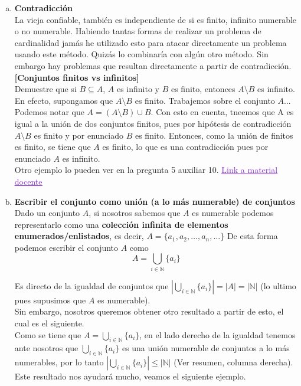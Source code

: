 \documentclass[letterpaper,12pt]{article}
\newcommand{\N}{\mathbb N}
\theoremstyle{plain}
\begin{document}
\begin{enumerate}[a)]
    \newpage
        
    \item \textbf{Contradicción}\\
        La vieja confiable, también es independiente de si es finito, infinito numerable o no numerable. Habiendo tantas formas de realizar un problema de cardinalidad jamás he utilizado esto para atacar directamente un problema usando este método. Quizás lo combinaría con algún otro método. Sin embargo hay problemas que resultan directamente a partir de contradicción.\\
        
        \textbf{[Conjuntos finitos vs infinitos]}\\
        Demuestre que si $B \subseteq A$, $A$ es infinito y $B$ es finito, entonces $A \setminus B$ es infinito.\\
        
        En efecto, supongamos que $A \setminus B$ es finito. Trabajemos sobre el conjunto $A$...\\
        Podemos notar que $A=(A\setminus B)\cup B$. Con esto en cuenta, tneemos que A es igual a la unión de dos conjuntos finitos, pues por hipótesis de contradicción $A \setminus B$ es finito y por enunciado $B$ es finito. Entonces, como la unión de finitos es finito, se tiene que $A$ es finito, lo que es una contradicción pues por enunciado $A$ es infinito.\\
        
        Otro ejemplo lo pueden ver en la pregunta 5 auxiliar 10. \href{https://www.u-cursos.cl/ingenieria/2017/1/MA1101/1/material_docente/}{\textcolor{BlueViolet}{\underline{Link a material docente}}}
        
        \newpage
    \item \textbf{Escribir el conjunto como unión (a lo más numerable) de conjuntos}\\
        Dado un conjunto $A$, si nosotros sabemos que $A$ es numerable podemos representarlo como una \textbf{colección infinita de elementos enumerados/enlistados}, es decir, $A=\{a_1,a_2,\dots, a_n,\dots \}$ De esta forma podemos escribir el conjunto $A$ como
        $$\displaystyle A=\bigcup_{i\in \N} \{a_i\}$$
    
        Es directo de la igualdad de conjuntos que $\displaystyle |\bigcup_{i\in \N} \{a_i\}|= |A| =|\N|$ (lo ultimo pues supusimos que $A$ es numerable).\\
        Sin embargo, nosotros queremos obtener otro resultado a partir de esto, el cual es el siguiente.\\
        Como se tiene que $\displaystyle A=\bigcup_{i\in \N} \{a_i\}$, en el lado derecho de la igualdad tenemos ante nosotros que $\displaystyle \bigcup_{i\in \N} \{a_i\}$ es una unión numerable de conjuntos a lo más numerables, por lo tanto $\displaystyle |\bigcup_{i\in \N} \{a_i\}|\leq |\N|$ (Ver resumen, columna derecha).
        Este resultado nos ayudará mucho, veamos el siguiente ejemplo.\\
    

\end{enumerate}
\end{document}
